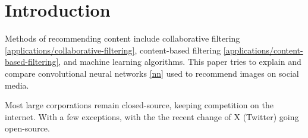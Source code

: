\section{Introduction} \label{introduction}

Methods of recommending content include collaborative filtering \ref{applications/collaborative-filtering}, content-based filtering \ref{applications/content-based-filtering}, and machine learning algorithms.\cite{10142790} This paper tries to explain and compare convolutional neural networks \ref{nn} used to recommend images on social media.

Most large corporations remain closed-source, keeping competition on the internet. With a few exceptions, with the the recent change of X (Twitter) going open-source. 